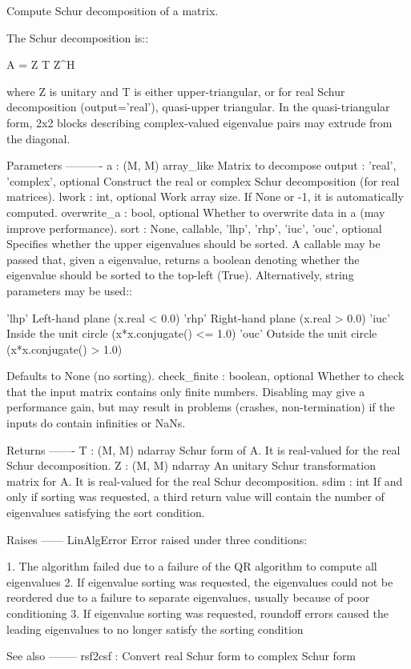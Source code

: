 \begin{DoxyVerb}Compute Schur decomposition of a matrix.

The Schur decomposition is::

    A = Z T Z^H

where Z is unitary and T is either upper-triangular, or for real
Schur decomposition (output='real'), quasi-upper triangular.  In
the quasi-triangular form, 2x2 blocks describing complex-valued
eigenvalue pairs may extrude from the diagonal.

Parameters
----------
a : (M, M) array_like
    Matrix to decompose
output : {'real', 'complex'}, optional
    Construct the real or complex Schur decomposition (for real matrices).
lwork : int, optional
    Work array size. If None or -1, it is automatically computed.
overwrite_a : bool, optional
    Whether to overwrite data in a (may improve performance).
sort : {None, callable, 'lhp', 'rhp', 'iuc', 'ouc'}, optional
    Specifies whether the upper eigenvalues should be sorted.  A callable
    may be passed that, given a eigenvalue, returns a boolean denoting
    whether the eigenvalue should be sorted to the top-left (True).
    Alternatively, string parameters may be used::

        'lhp'   Left-hand plane (x.real < 0.0)
        'rhp'   Right-hand plane (x.real > 0.0)
        'iuc'   Inside the unit circle (x*x.conjugate() <= 1.0)
        'ouc'   Outside the unit circle (x*x.conjugate() > 1.0)

    Defaults to None (no sorting).
check_finite : boolean, optional
    Whether to check that the input matrix contains only finite numbers.
    Disabling may give a performance gain, but may result in problems
    (crashes, non-termination) if the inputs do contain infinities or NaNs.

Returns
-------
T : (M, M) ndarray
    Schur form of A. It is real-valued for the real Schur decomposition.
Z : (M, M) ndarray
    An unitary Schur transformation matrix for A.
    It is real-valued for the real Schur decomposition.
sdim : int
    If and only if sorting was requested, a third return value will
    contain the number of eigenvalues satisfying the sort condition.

Raises
------
LinAlgError
    Error raised under three conditions:

    1. The algorithm failed due to a failure of the QR algorithm to
       compute all eigenvalues
    2. If eigenvalue sorting was requested, the eigenvalues could not be
       reordered due to a failure to separate eigenvalues, usually because
       of poor conditioning
    3. If eigenvalue sorting was requested, roundoff errors caused the
       leading eigenvalues to no longer satisfy the sorting condition

See also
--------
rsf2csf : Convert real Schur form to complex Schur form\end{DoxyVerb}
 

